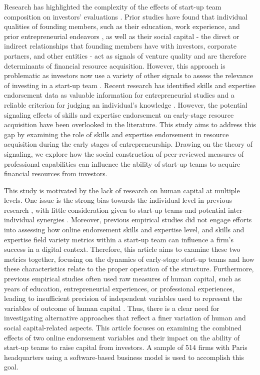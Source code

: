 \documentclass[12pt]{article}
\begin{document}
Research has highlighted the complexity of the effects of start-up team composition on investors' evaluations \citep{cooper1994initial, ghassemiautomated}. Prior studies have found that individual qualities of founding members, such as their education, work experience, and prior entrepreneurial endeavors \citep{shane2002network, hsu2007experienced}, as well as their social capital - the direct or indirect relationships that founding members have with investors, corporate partners, and other entities \citep{shane2002network, hsu2007experienced, huang2017resources} - act as signals of venture quality and are therefore determinants of financial resource acquisition. However, this approach is problematic as investors now use a variety of other signals to assess the relevance of investing in a start-up team \citep{banerji2019startup, mollick2014dynamics, courtney2017resolving}. Recent research has identified skills and expertise endorsement data \citep{perez2016endorsement, wu2018analysis} as valuable information for entrepreneurial studies and a reliable criterion for judging an individual's knowledge \citep{rapanta2017linkedin, reese2020should, sako2020scaling}. However, the potential signaling effects of skills and expertise endorsement on early-stage resource acquisition have been overlooked in the literature. This study aims to address this gap by examining the role of skills and expertise endorsement in resource acquisition during the early stages of entrepreneurship. Drawing on the theory of signaling, we explore how the social construction of peer-reviewed measures of professional capabilities can influence the ability of start-up teams to acquire financial resources from investors.

This study is motivated by the lack of research on human capital at multiple levels. One issue is the strong bias towards the individual level in previous research \citep{marvel2016human}, with little consideration given to start-up teams and potential inter-individual synergies \citep{knight2020start}. Moreover, previous empirical studies did not engage efforts into assessing how online endorsement skills and expertise level, and skills and expertise field variety metrics within a start-up team can influence a firm's success in a digital context. Therefore, this article aims to examine these two metrics together, focusing on the dynamics of early-stage start-up teams and how these characteristics relate to the proper operation of the structure. Furthermore, previous empirical studies often used raw measures of human capital, such as years of education, entrepreneurial experiences, or professional experiences, leading to insufficient precision of independent variables used to represent the variables of outcome of human capital \citep{harrison2007s}. Thus, there is a clear need for investigating alternative approaches that reflect a finer variation of human and social capital-related aspects. This article focuses on examining the combined effects of two online endorsement variables and their impact on the ability of start-up teams to raise capital from investors. A sample of 514 firms with Paris headquarters using a software-based business model is used to accomplish this goal.
\end{document}
